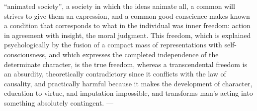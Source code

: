 ``animated society'', a society in which the ideas animate all, a
common will strives to give them an expression, and a common good
conscience makes known a condition that corresponds to what in the
individual was inner freedom: action in agreement with insight, the
moral judgment. This freedom, which is explained psychologically by the
fusion of a compact mass of representations with self-consciousness,
and which expresses the completed independence of the determinate
character, is the true freedom, whereas a transcendental freedom is an
absurdity, theoretically contradictory since it conflicts with the law
of causality, and practically harmful because it makes the development
of character, education to virtue, and imputation impossible, and
transforms man's acting into something absolutely contingent. ---

\divrule

